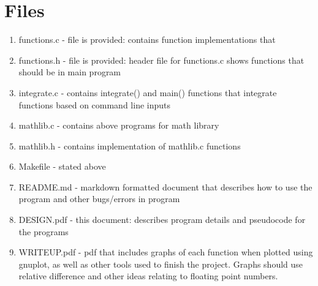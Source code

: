 \documentclass[11pt]{article}
\begin{document}
\section{Files}\label{ss:files}
\begin{enumerate}
	\item functions.c - file is provided: contains function implementations that
	\item functions.h - file is provided: header file for functions.c shows functions that should be in main program
	\item integrate.c - contains integrate() and main() functions that integrate functions based on command line inputs
	\item mathlib.c - contains above programs for math library
	\item mathlib.h - contains implementation of mathlib.c functions
	\item Makefile - stated above
	\item README.md - markdown formatted document that describes how to use the program and other bugs/errors in program
	\item DESIGN.pdf - this document: describes program details and pseudocode for the programs
	\item WRITEUP.pdf - pdf that includes graphs of each function when plotted using gnuplot, as well as other tools used to finish the project. Graphs should use relative difference and other ideas relating to floating point numbers.
\end{enumerate}
\end{document}
